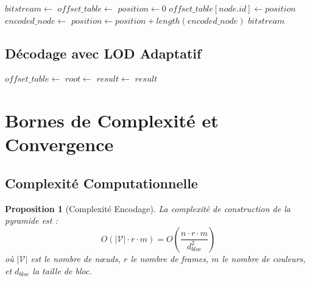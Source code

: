 \documentclass[12pt,a4paper]{article}
\newtheorem{proposition}[theorem]{Proposition}
\theoremstyle{definition}
\begin{document}
	\begin{algorithm}[h]
		\caption{Encodage avec Offset Table}
		\label{algo:encodage_offset}
		\begin{algorithmic}[1]
			\State $bitstream \gets$ 
			\State $offset\_table \gets$ 
			\State $position \gets 0$
			\State $offset\_table[node.id] \gets position$
			\State $encoded\_node \gets$ 
			\State {}
			\State $position \gets position + length(encoded\_node)$
			\EndFor
			\State {}
			\State \Return $bitstream$
			\EndProcedure
		\end{algorithmic}
	\end{algorithm}
	
	\subsection{Décodage avec LOD Adaptatif}
	
	\begin{algorithm}[h]
		\caption{Décodage avec LOD Adaptatif}
		\label{algo:decodage_lod}
		\begin{algorithmic}[1]
			\State $offset\_table \gets$ 
			\State $root \gets$ 
			\State $result \gets$ 
			\State \Return $result$
			\EndProcedure
		\end{algorithmic}
	\end{algorithm}
	
	\section{Bornes de Complexité et Convergence}
	
	\subsection{Complexité Computationnelle}
	
	\begin{proposition}[Complexité Encodage]
		\label{prop:complexite_encodage}
		La complexité de construction de la pyramide est :
		\begin{equation}
			O(|\mathcal{V}| \cdot r \cdot m) = O\left(\frac{n \cdot r \cdot m}{d_{bloc}^2}\right)
		\end{equation}
		où $|\mathcal{V}|$ est le nombre de nœuds, $r$ le nombre de frames, $m$ le nombre de couleurs, et $d_{bloc}$ la taille de bloc.
	\end{proposition}
	
\end{document}
